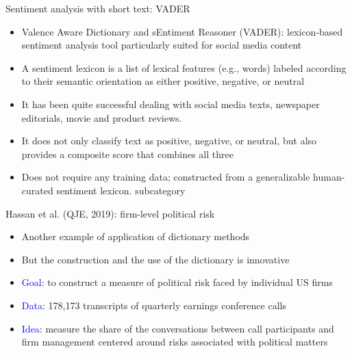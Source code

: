 \documentclass[english]{beamer}
\begin{document}
\begin{frame}{Sentiment analysis with short text: VADER}
\begin{itemize}
\setlength{\itemsep}{1em}
\item Valence Aware Dictionary and sEntiment Reasoner (VADER): lexicon-based sentiment analysis tool particularly suited for
social media content
\item A sentiment lexicon is a list of lexical features (e.g., words) labeled according to their semantic orientation as either positive, negative, or neutral
\item It has been quite successful dealing with social media texts, newspaper editorials, movie and product reviews.
\item It does not only classify text as positive, negative, or neutral, but also provides a composite score that combines all three
\item Does not require any training data; constructed from a generalizable human-curated sentiment lexicon. subcategory
\end{itemize}
\end{frame}

\begin{frame}{Hassan et al. (QJE, 2019): firm-level political risk}
\begin{itemize}
\setlength{\itemsep}{1.35em}
\item Another example of application of dictionary methods
\item But the construction and the use of the dictionary is innovative
\pause
\item \textcolor{blue}{Goal}: to construct a measure of political risk faced by individual US firms
\item \textcolor{blue}{Data}: 178,173 transcripts of quarterly earnings conference calls
\pause
\item \textcolor{blue}{Idea}: measure the share of the conversations between call participants and firm management centered around risks associated with political matters
\end{itemize}
\end{frame}
\end{document}
